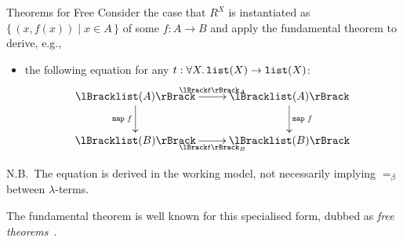 \begin{frame}{Theorems for Free}
  Consider the case that $R^X$ is instantiated as $\{\,(x, f(x)) \mid x \in A \,\}$ of some $f\colon A \to B$ and apply the fundamental theorem to derive, e.g.,
  \begin{itemize}
    \item the following equation for any $t : \forall X.\, \mathtt{list}(X) \to \mathtt{list}(X)$:
      \[
        \xymatrix{
          \Brackets{\List(A)} \ar[r]^{\Brackets{t}_A} \ar[d]_{\mathtt{map}\;f} & \Brackets{\List(A)} \ar[d]^{\mathtt{map}\;f} \\
          \Brackets{\List(B)} \ar[r]_{\Brackets{t}_B }& \Brackets{\List(B)}
        }
      \]
  \end{itemize}
  N.B.\ The equation is derived in the working model, not necessarily implying $=_{\beta}$ between $\lambda$-terms.

  The fundamental theorem is well known for this specialised form, dubbed as \emph{free theorems}~\cite{Wadler1989}. 
\end{frame}

